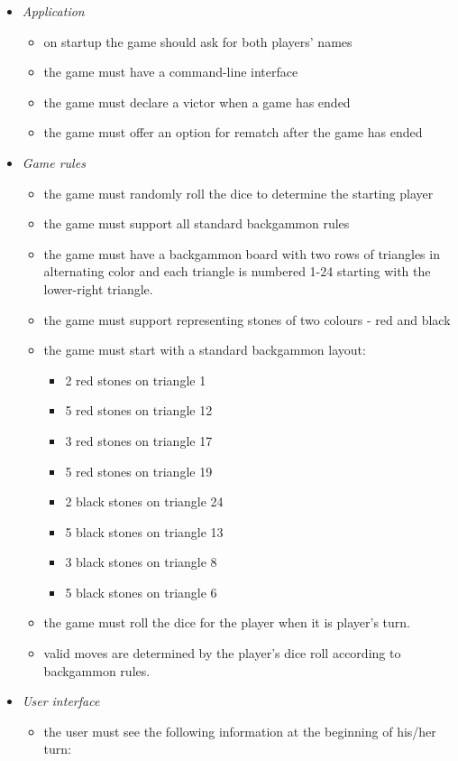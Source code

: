 \documentclass[11pt]{article}
\begin{document}
\begin{itemize}
\item \emph{Application}
\begin{itemize}
\item on startup the game should ask for both players' names
\item the game must have a command-line interface
\item the game must declare a victor when a game has ended
\item the game must offer an option for rematch after the game has ended
\end{itemize}
\item \emph{Game rules}
\begin{itemize}
\item the game must randomly roll the dice to determine the starting player
\item the game must support all standard backgammon rules
\item the game must have a backgammon board with two rows of triangles in alternating color and each triangle is numbered 1-24 starting with the lower-right triangle.
\item the game must support representing stones of two colours - red and black
\item the game must start with a standard backgammon layout:
\begin{itemize}
\item 2 red stones on triangle 1
\item 5 red stones on triangle 12
\item 3 red stones on triangle 17
\item 5 red stones on triangle 19
\item 2 black stones on triangle 24
\item 5 black stones on triangle 13
\item 3 black stones on triangle 8
\item 5 black stones on triangle 6
\end{itemize}
\item the game must roll the dice for the player when it is player's turn.
\item valid moves are determined by the player's dice roll according to backgammon rules.
\end{itemize}
\item \emph{User interface}
\begin{itemize}
\item the user must see the following information at the beginning of his/her turn:

\end{itemize}
\end{itemize}
\end{document}
